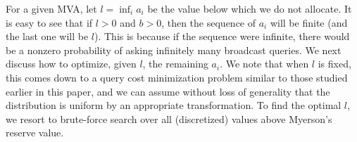 




For a given MVA, let $l = \inf_i a_i$ be the value below which we do not
allocate.  It is easy to see that if $l>0$ and $b>0$, then the sequence of
$a_i$ will be finite (and the last one will be $l$). This is because if the
sequence were infinite, there would be a nonzero probability of asking
infinitely many broadcast queries.  We next discuss how to optimize, given
$l$, the remaining $a_i$.  We note that when $l$ is fixed, this comes down
to a query cost minimization problem similar to those studied earlier in
this paper, and we can assume without loss of generality that the
distribution is uniform by an appropriate transformation.  To find the
optimal $l$, we resort to brute-force search over all (discretized) values
above Myerson's reserve value.




